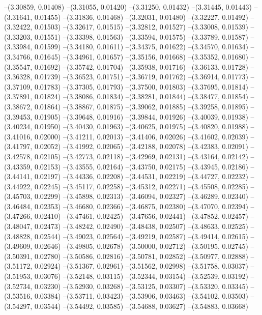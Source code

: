 --(3.30859, 0.01408)
--(3.31055, 0.01420)
--(3.31250, 0.01432)
--(3.31445, 0.01443)
--(3.31641, 0.01455)
--(3.31836, 0.01468)
--(3.32031, 0.01480)
--(3.32227, 0.01492)
--(3.32422, 0.01503)
--(3.32617, 0.01515)
--(3.32812, 0.01527)
--(3.33008, 0.01539)
--(3.33203, 0.01551)
--(3.33398, 0.01563)
--(3.33594, 0.01575)
--(3.33789, 0.01587)
--(3.33984, 0.01599)
--(3.34180, 0.01611)
--(3.34375, 0.01622)
--(3.34570, 0.01634)
--(3.34766, 0.01645)
--(3.34961, 0.01657)
--(3.35156, 0.01668)
--(3.35352, 0.01680)
--(3.35547, 0.01692)
--(3.35742, 0.01704)
--(3.35938, 0.01716)
--(3.36133, 0.01728)
--(3.36328, 0.01739)
--(3.36523, 0.01751)
--(3.36719, 0.01762)
--(3.36914, 0.01773)
--(3.37109, 0.01783)
--(3.37305, 0.01793)
--(3.37500, 0.01803)
--(3.37695, 0.01814)
--(3.37891, 0.01824)
--(3.38086, 0.01834)
--(3.38281, 0.01844)
--(3.38477, 0.01854)
--(3.38672, 0.01864)
--(3.38867, 0.01875)
--(3.39062, 0.01885)
--(3.39258, 0.01895)
--(3.39453, 0.01905)
--(3.39648, 0.01916)
--(3.39844, 0.01926)
--(3.40039, 0.01938)
--(3.40234, 0.01950)
--(3.40430, 0.01963)
--(3.40625, 0.01975)
--(3.40820, 0.01988)
--(3.41016, 0.02000)
--(3.41211, 0.02013)
--(3.41406, 0.02026)
--(3.41602, 0.02039)
--(3.41797, 0.02052)
--(3.41992, 0.02065)
--(3.42188, 0.02078)
--(3.42383, 0.02091)
--(3.42578, 0.02105)
--(3.42773, 0.02118)
--(3.42969, 0.02131)
--(3.43164, 0.02142)
--(3.43359, 0.02153)
--(3.43555, 0.02164)
--(3.43750, 0.02175)
--(3.43945, 0.02186)
--(3.44141, 0.02197)
--(3.44336, 0.02208)
--(3.44531, 0.02219)
--(3.44727, 0.02232)
--(3.44922, 0.02245)
--(3.45117, 0.02258)
--(3.45312, 0.02271)
--(3.45508, 0.02285)
--(3.45703, 0.02299)
--(3.45898, 0.02313)
--(3.46094, 0.02327)
--(3.46289, 0.02340)
--(3.46484, 0.02353)
--(3.46680, 0.02366)
--(3.46875, 0.02380)
--(3.47070, 0.02394)
--(3.47266, 0.02410)
--(3.47461, 0.02425)
--(3.47656, 0.02441)
--(3.47852, 0.02457)
--(3.48047, 0.02473)
--(3.48242, 0.02490)
--(3.48438, 0.02507)
--(3.48633, 0.02525)
--(3.48828, 0.02544)
--(3.49023, 0.02564)
--(3.49219, 0.02587)
--(3.49414, 0.02615)
--(3.49609, 0.02646)
--(3.49805, 0.02678)
--(3.50000, 0.02712)
--(3.50195, 0.02745)
--(3.50391, 0.02780)
--(3.50586, 0.02816)
--(3.50781, 0.02852)
--(3.50977, 0.02888)
--(3.51172, 0.02924)
--(3.51367, 0.02961)
--(3.51562, 0.02998)
--(3.51758, 0.03037)
--(3.51953, 0.03076)
--(3.52148, 0.03115)
--(3.52344, 0.03154)
--(3.52539, 0.03192)
--(3.52734, 0.03230)
--(3.52930, 0.03268)
--(3.53125, 0.03307)
--(3.53320, 0.03345)
--(3.53516, 0.03384)
--(3.53711, 0.03423)
--(3.53906, 0.03463)
--(3.54102, 0.03503)
--(3.54297, 0.03544)
--(3.54492, 0.03585)
--(3.54688, 0.03627)
--(3.54883, 0.03668)
